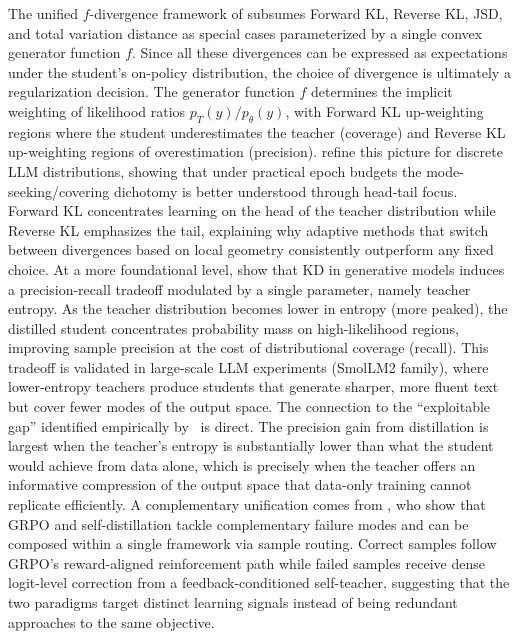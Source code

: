 \documentclass{article} %
\newcommand{\ptheta}{p_\theta}
\newcommand{\pteacher}{p_T}
\begin{document}
The unified $f$-divergence framework of \citet{2307.15190} subsumes Forward KL, Reverse KL, JSD, and total variation distance as special cases parameterized by a single convex generator function $f$. Since all these divergences can be expressed as expectations under the student's on-policy distribution, the choice of divergence is ultimately a regularization decision. The generator function $f$ determines the implicit weighting of likelihood ratios $\pteacher(y)/\ptheta(y)$, with Forward KL up-weighting regions where the student underestimates the teacher (coverage) and Reverse KL up-weighting regions of overestimation (precision). \citet{2404.02657} refine this picture for discrete LLM distributions, showing that under practical epoch budgets the mode-seeking/covering dichotomy is better understood through head-tail focus. Forward KL concentrates learning on the head of the teacher distribution while Reverse KL emphasizes the tail, explaining why adaptive methods that switch between divergences based on local geometry consistently outperform any fixed choice. At a more foundational level, \citet{2505.13111} show that KD in generative models induces a precision-recall tradeoff modulated by a single parameter, namely teacher entropy. As the teacher distribution becomes lower in entropy (more peaked), the distilled student concentrates probability mass on high-likelihood regions, improving sample precision at the cost of distributional coverage (recall). This tradeoff is validated in large-scale LLM experiments (SmolLM2 family), where lower-entropy teachers produce students that generate sharper, more fluent text but cover fewer modes of the output space. The connection to the ``exploitable gap'' identified empirically by~\citet{li2026rethinking} is direct. The precision gain from distillation is largest when the teacher's entropy is substantially lower than what the student would achieve from data alone, which is precisely when the teacher offers an informative compression of the output space that data-only training cannot replicate efficiently. A complementary unification comes from \citet{li2026unifying}, who show that GRPO and self-distillation tackle complementary failure modes and can be composed within a single framework via sample routing. Correct samples follow GRPO's reward-aligned reinforcement path while failed samples receive dense logit-level correction from a feedback-conditioned self-teacher, suggesting that the two paradigms target distinct learning signals instead of being redundant approaches to the same objective.
\end{document}
